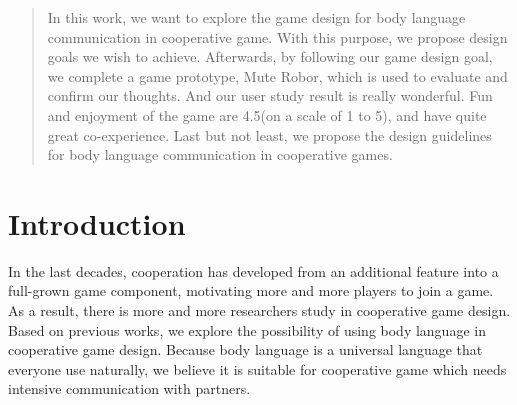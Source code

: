 \documentclass{sigchi}
\begin{document}
\begin{abstract}


In this work, we want to explore the game design for body language communication in cooperative game. With this purpose, we propose design goals we wish to achieve. Afterwards, by following our game design goal, we complete a game prototype, Mute Robor, which is used to evaluate and confirm our thoughts. And our user study result is really wonderful. Fun and enjoyment of the game are 4.5(on a scale of 1 to 5), and have quite great co-experience. Last but not least, we propose the design guidelines for body language communication in cooperative games.


\end{abstract}




\section{Introduction}

In the last decades, cooperation has developed from an additional feature into a full-grown game component, motivating more and more players to join a game. As a result, there is more and more researchers study in cooperative game design. Based on previous works, we explore the possibility of using body language in cooperative game design. Because body language is a universal language that everyone use naturally, we believe it is suitable for cooperative game which needs intensive communication with partners.
\end{document}
